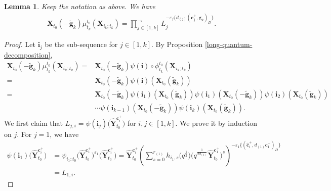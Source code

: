 \documentclass[pdftex]{sigma}
\numberwithin{equation}{section}
\newtheorem{Lemma}[Theorem]{Lemma}
\begin{document}
\begin{Lemma}\label{product_of_F_polynomial}
 Keep the notation as above. We have
 \begin{align}\label{eq:f-poly-well-def}
 \mathbf{X}_{t_{0}}(-\mathbf{\tilde{g}}_{k})\mu_{t_{k}}^{t_{0}}(\mathbf{X}_{i_{k};t_{k}})=\prod\limits^{\longrightarrow}_{j\in[1,k]}L_{j}^{-\varepsilon_{j}\{d_{(j)}(\mathbf{c}_{j}^{+},\mathbf{g}_{k})_D\}}.
 \end{align}

\end{Lemma}
\begin{proof}
 Let $\mathbf{i}_{j}$ be the sub-sequence  for $j\in [1,k]$.
 By Proposition \ref{long-quantum-decomposition},
 \begin{align*}
 \mathbf{X}_{t_{0}}(-\mathbf{\tilde{g}}_{k})\mu_{t_{k}}^{t_{0}}(\mathbf{X}_{i_{k};t_{k}})
 ={}&\mathbf{X}_{t_{0}}(-\mathbf{\tilde{g}}_{k})\psi(\mathbf{i})\circ\phi_{t_{k}}^{t_0}(\mathbf{X}_{i_{k};t_{k}})\\
 ={}&\mathbf{X}_{t_{0}}(-\mathbf{\tilde{g}}_{k})\psi(\mathbf{i})(\mathbf{X}_{t_{0}}(\mathbf{\tilde{g}}_{k}))\\
 ={}&\mathbf{X}_{t_{0}}(-\mathbf{\tilde{g}}_{k})\psi(\mathbf{i}_{1})(\mathbf{X}_{t_{0}}(\mathbf{\tilde{g}}_{k}))\psi(\mathbf{i}_{1})(\mathbf{X}_{t_{0}}(-\mathbf{\tilde{g}}_{k}))\psi(\mathbf{i}_{2})(\mathbf{X}_{t_{0}}(\mathbf{\tilde{g}}_{k}))\\
 &\cdots\psi(\mathbf{i}_{k-1})(\mathbf{X}_{t_{0}}(-\mathbf{\tilde{g}}_{k}))\psi(\mathbf{i}_{k})(\mathbf{X}_{t_{0}}(\mathbf{\tilde{g}}_{k})).
 \end{align*}
 We first claim that $L_{j,i}=\psi(\mathbf{i}_{j})\bigl(\mathbf{\hat{Y}}_{t_{0}}^{\mathbf{c}_{i}^{+}}\bigr)$
 for $i,j\in[1,k]$. We prove it by induction on $j$.
 For $j=1$, we have
 \begin{align*}
 \psi(\mathbf{i}_{1})\bigl(\mathbf{\hat{Y}}_{t_{0}}^{\mathbf{c}_{i}^{+}}\bigr)
 &=\psi_{i_{1}:t_{0}}\bigl(\mathbf{\hat{Y}}_{t_{0}}^{\mathbf{c}_{1}^{+}}\bigr)^{\varepsilon_{1}}\bigl(\mathbf{\hat{Y}}_{t_{0}}^{\mathbf{c}_{i}^{+}}\bigr)=\mathbf{\hat{Y}}_{t_{0}}^{\mathbf{c}_{i}^{+}}\left(\sum\limits^{r_{(1)}}_{s=0}h_{i_{1},s}\bigl(q^{\frac{1}{2}}\bigr)
 \bigl(q^{\frac{1}{2d_{(1)}}}\mathbf{\hat{Y}}_{t_{0}}^{\mathbf{c}_{1}^{+}}\bigr)^{s}\right)^{-\varepsilon_{1}\{(\mathbf{\hat{c}}_{i}^{+},d_{(1)}\mathbf{c}_{1}^{+})_{D}\}}\\
 &=L_{1,i}.
 \end{align*}

\end{proof}
\end{document}
